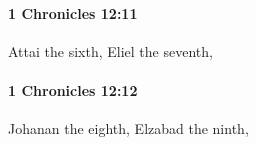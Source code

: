 		\paragraph{1 Chronicles 12:11} %
			\label{1CHRONICLES-12-11}

			Attai the sixth, Eliel the seventh,


		\paragraph{1 Chronicles 12:12} %
			\label{1CHRONICLES-12-12}

			Johanan the eighth, Elzabad the ninth,


